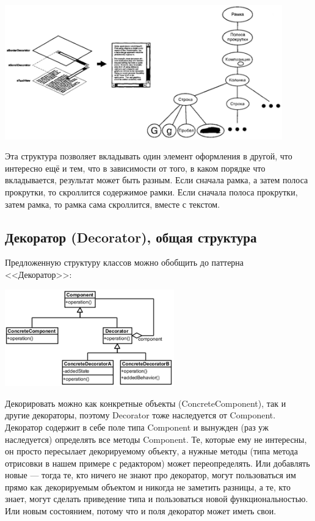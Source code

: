 \documentclass{../../text-style}
\begin{document}
\begin{center}
    \includegraphics[width=0.9\textwidth]{glyphStructure.png}
\end{center}

Эта структура позволяет вкладывать один элемент оформления в другой, что интересно ещё и тем, что в зависимости от того, в каком порядке что вкладывается, результат может быть разным. Если сначала рамка, а затем полоса прокрутки, то скроллится содержимое рамки. Если сначала полоса прокрутки, затем рамка, то рамка сама скроллится, вместе с текстом.

\subsection{Декоратор (Decorator), общая структура}

Предложенную структуру классов можно обобщить до паттерна <<Декоратор>>:

\begin{center}
    \includegraphics[width=0.55\textwidth]{decorator.png}
\end{center}

Декорировать можно как конкретные объекты (ConcreteComponent), так и другие декораторы, поэтому Decorator тоже наследуется от Component. Декоратор содержит в себе поле типа Component и вынужден (раз уж наследуется) определять все методы Component. Те, которые ему не интересны, он просто пересылает декорируемому объекту, а нужные методы (типа метода отрисовки в нашем примере с редактором) может переопределять. Или добавлять новые --- тогда те, кто ничего не знают про декоратор, могут пользоваться им прямо как декорируемым объектом и никогда не заметить разницы, а те, кто знает, могут сделать приведение типа и пользоваться новой функциональностью. Или новым состоянием, потому что и поля декоратор может иметь свои.
\end{document}
